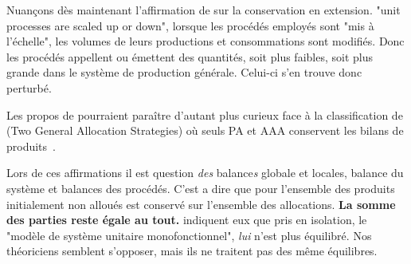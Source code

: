 Nuançons dès maintenant l'affirmation de \citeauthor{weidema_avoiding_2010} sur la conservation en extension.
"unit processes are scaled up or down", lorsque les procédés employés sont "mis à l'échelle", les volumes de leurs productions et consommations sont modifiés.
Donc les procédés appellent ou émettent des quantités, soit plus faibles, soit plus grande dans le système de production générale.
Celui-ci s'en trouve donc perturbé.

Les propos de \citeauthor{weidema_avoiding_2010} pourraient paraître d'autant plus curieux face à la classification de \citeauthor{majeau-bettez_unified_2014} (Two General Allocation Strategies) où seuls PA et AAA conservent les bilans de produits~\cite{majeau-bettez_unified_2014}.

Lors de ces affirmations il est question \emph{des} balance\emph{s} globale et locales, balance du système et balances des procédés.
C'est a dire que pour \citeauthor{majeau-bettez_unified_2014} 
l'ensemble des produits initialement non alloués est conservé sur l'ensemble des allocations.
\textbf{La somme des parties reste égale au tout.}
\citeauthor{weidema_avoiding_2010} indiquent eux que pris en isolation, le "modèle de système unitaire monofonctionnel", \emph{lui} n'est plus équilibré.
Nos théoriciens semblent s'opposer, mais ils ne traitent pas des même équilibres.

